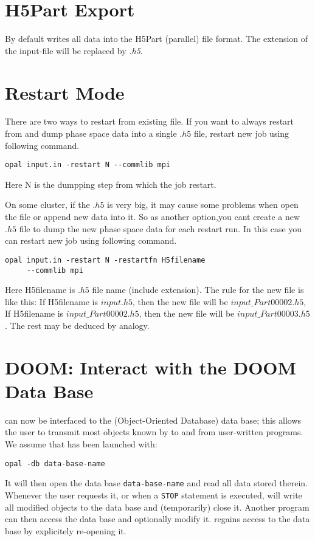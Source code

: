 \section{H5Part Export}
\label{sec:h5partexport}
By default \opal writes all data into the H5Part (parallel) file format.
The extension of the input-file will be replaced by {\em .h5}.


\section{Restart Mode}
\label{sec:Restart}
There are two ways to restart from existing file. 
If you want to always restart from and dump phase space data into a single $.h5$ file, 
restart new job using following command.
\begin{verbatim}
opal input.in -restart N --commlib mpi
\end{verbatim}
Here N is the dumpping step from which the job restart.  

On some cluster, if the $.h5$ is very big, it may cause some problems when open the file or
append new data into it. So as another option,you cant create a new $.h5$ file to dump the 
new phase space data for each restart run. In this case you can restart new job using following command.  
\begin{verbatim}
opal input.in -restart N -restartfn H5filename 
     --commlib mpi
\end{verbatim}
Here H5filename is $.h5$ file name (include extension). The rule for the new file is like this:
If H5filename is $input.h5$, then the new file will be $input\_Part00002.h5$,
If H5filename is $input\_Part00002.h5$, then the new file will be $input\_Part00003.h5$.
The rest may be deduced by analogy.

\section{DOOM: Interact with the DOOM Data Base}
\label{sec:doom}
\opal can now be interfaced to the 
(\opal Object-Oriented Database)
data base; this allows the user to transmit most objects known by \opal
to and from user-written programs.
We assume that \opal has been launched with:
\begin{verbatim}
opal -db data-base-name
\end{verbatim}
It will then open the data base \texttt{data-base-name} and read all
data stored therein.
Whenever the user requests it, or when a \texttt{STOP} statement is 
executed, \opal will write all modified objects to the data base and
(temporarily) close it.
Another program can then access the data base and optionally modify it.
\opal regains access to the data base by explicitely re-opening it.

